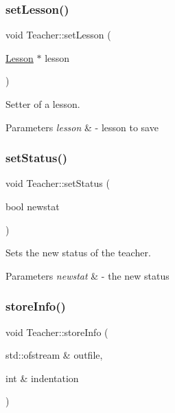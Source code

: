 \subsubsection{\texorpdfstring{set\+Lesson()}{setLesson()}}
{\footnotesize\ttfamily void Teacher\+::set\+Lesson (\begin{DoxyParamCaption}\item[{\mbox{\hyperlink{class_lesson}{Lesson}} $\ast$}]{lesson }\end{DoxyParamCaption})}



Setter of a lesson. 


\begin{DoxyParams}{Parameters}
{\em lesson} & -\/ lesson to save \\
\hline
\end{DoxyParams}
\mbox{\label{class_teacher_a024a7daf22ee3ac310b69ba72fda5bb3}} 
\subsubsection{\texorpdfstring{set\+Status()}{setStatus()}}
{\footnotesize\ttfamily void Teacher\+::set\+Status (\begin{DoxyParamCaption}\item[{bool}]{newstat }\end{DoxyParamCaption})}



Sets the new status of the teacher. 


\begin{DoxyParams}{Parameters}
{\em newstat} & -\/ the new status \\
\hline
\end{DoxyParams}
\mbox{\label{class_teacher_a2ece0d60fa7ec4aaf93333aa0be0d25f}} 
\subsubsection{\texorpdfstring{store\+Info()}{storeInfo()}}
{\footnotesize\ttfamily void Teacher\+::store\+Info (\begin{DoxyParamCaption}\item[{std\+::ofstream \&}]{outfile,  }\item[{int \&}]{indentation }\end{DoxyParamCaption})\hspace{0.3cm}{\ttfamily [virtual]}}



